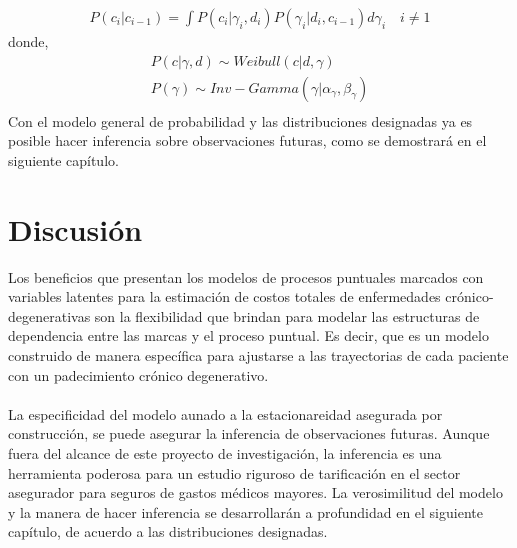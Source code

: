 \begin{align*}
P(c_i|c_{i-1})=\int P(c_i|\gamma_i,d_i)P(\gamma_i|d_i,c_{i-1})d\gamma_i \quad i \neq 1
\end{align*}
donde,
\begin{align*}
P(c|\gamma,d) \sim Weibull(c|d,\gamma)\\
P(\gamma) \sim Inv-Gamma(\gamma|\alpha_\gamma,\beta_\gamma)\\
\end{align*}
Con el modelo general de probabilidad y las distribuciones designadas ya es posible hacer inferencia sobre observaciones futuras, como se demostrar\'a en el siguiente cap\'itulo.
\section{Discusi\'on}
Los beneficios que presentan los modelos de procesos puntuales marcados con variables latentes para la estimaci\'on de costos totales de enfermedades cr\'onico-degenerativas son la flexibilidad que brindan para modelar las estructuras de dependencia entre las marcas y el proceso puntual. Es decir, que es un modelo construido de manera espec\'ifica para ajustarse a las trayectorias de cada paciente con un padecimiento cr\'onico degenerativo.\\
\\ 
La especificidad del modelo aunado a la estacionareidad asegurada por construcci\'on, se puede asegurar la inferencia de observaciones futuras. Aunque fuera del alcance de este proyecto de investigaci\'on, la inferencia es una herramienta poderosa para un estudio riguroso de tarificaci\'on en el sector asegurador para seguros de gastos m\'edicos mayores. La verosimilitud del modelo y la manera de hacer inferencia se desarrollar\'an a profundidad en el siguiente cap\'itulo, de acuerdo a las distribuciones designadas.